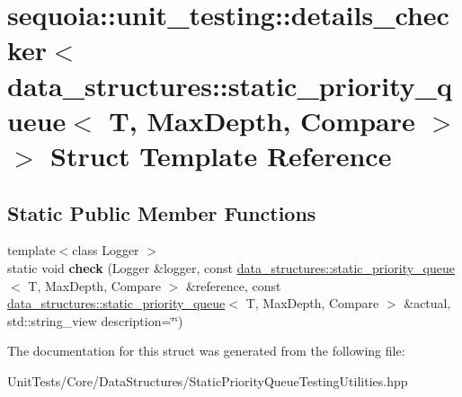 \hypertarget{structsequoia_1_1unit__testing_1_1details__checker_3_01data__structures_1_1static__priority__que85e4d6fe392e480483202a13da7c4b95}{}\section{sequoia\+::unit\+\_\+testing\+::details\+\_\+checker$<$ data\+\_\+structures\+::static\+\_\+priority\+\_\+queue$<$ T, Max\+Depth, Compare $>$ $>$ Struct Template Reference}
\label{structsequoia_1_1unit__testing_1_1details__checker_3_01data__structures_1_1static__priority__que85e4d6fe392e480483202a13da7c4b95}
\subsection*{Static Public Member Functions}
\begin{DoxyCompactItemize}
\item 
\mbox{\label{structsequoia_1_1unit__testing_1_1details__checker_3_01data__structures_1_1static__priority__que85e4d6fe392e480483202a13da7c4b95_a8c379217f7cd91efcbfbbd0dc0a21467}} 
{\footnotesize template$<$class Logger $>$ }\\static void {\bfseries check} (Logger \&logger, const \mbox{\hyperlink{classsequoia_1_1data__structures_1_1static__priority__queue}{data\+\_\+structures\+::static\+\_\+priority\+\_\+queue}}$<$ T, Max\+Depth, Compare $>$ \&reference, const \mbox{\hyperlink{classsequoia_1_1data__structures_1_1static__priority__queue}{data\+\_\+structures\+::static\+\_\+priority\+\_\+queue}}$<$ T, Max\+Depth, Compare $>$ \&actual, std\+::string\+\_\+view description=\char`\"{}\char`\"{})
\end{DoxyCompactItemize}


The documentation for this struct was generated from the following file\+:\begin{DoxyCompactItemize}
\item 
Unit\+Tests/\+Core/\+Data\+Structures/Static\+Priority\+Queue\+Testing\+Utilities.\+hpp\end{DoxyCompactItemize}
